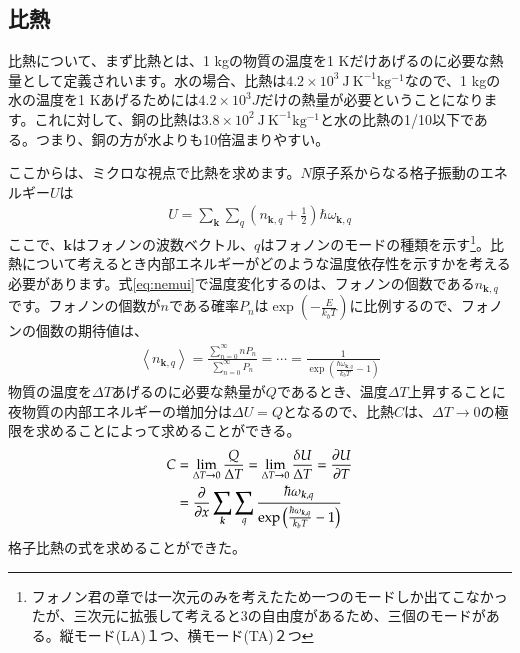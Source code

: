 \documentclass[10pt,b5paper,papersize,dvipdfmx]{jsbook}
\begin{document}
\subsection{比熱}
比熱について、まず比熱とは、1 kgの物質の温度を1 Kだけあげるのに必要な熱量として定義されいます。水の場合、比熱は$4.2 \times 10^3\  \mathrm{J\ K ^{-1} kg^{-1}}$なので、1 kgの水の温度を1 Kあげるためには$4.2 \times 10^3 J$だけの熱量が必要ということになります。これに対して、銅の比熱は$3.8 \times 10^2\ \mathrm{J\ K ^{-1} kg^{-1}}$と水の比熱の1/10以下である。つまり、銅の方が水よりも10倍温まりやすい。\par
ここからは、ミクロな視点で比熱を求めます。$N$原子系からなる格子振動のエネルギー$U$は
\begin{align}
  U = \sum_{\bm{k}}\sum_{q}\left(n_{\bm{k},q} + \frac{1}{2}\right)\hbar \omega_{\bm{k},q}
  \label{eq:nemui}
\end{align}
ここで、$\bm{k}$はフォノンの波数ベクトル、$q$はフォノンのモードの種類を示す\footnote{フォノン君の章では一次元のみを考えたため一つのモードしか出てこなかったが、三次元に拡張して考えると3の自由度があるため、三個のモードがある。縦モード(LA)１つ、横モード(TA)２つ}。比熱について考えるとき内部エネルギーがどのような温度依存性を示すかを考える必要があります。式\ref{eq:nemui}で温度変化するのは、フォノンの個数である$n_{\bm{k},q}$です。フォノンの個数が$n$である確率$P_n$は$\exp\left(-\frac{E}{k_bT}\right)$に比例するので、フォノンの個数の期待値は、
\begin{align}
  \left\langle n_{\bm{k},q}\right\rangle = \frac{\sum_{n = 0}^\infty nP_n}{\sum_{n = 0}^\infty P_n} = \cdots = \frac{1}{\exp \left(\frac{\hbar \omega_{\bm{k}, q}}{k_bT}-1\right)}
\end{align}
物質の温度を$\Delta T$あげるのに必要な熱量が$Q$であるとき、温度$\Delta T$上昇することに夜物質の内部エネルギーの増加分は$\Delta U = Q$となるので、比熱$C$は、$\Delta T \rightarrow 0$の極限を求めることによって求めることができる。
\begin{align}
  C &= \lim_{\Delta T \rightarrow 0} \frac{Q}{\Delta T} = \lim_{\Delta T \rightarrow 0} \frac{\delta U}{\Delta T} = \pdv{U}{T}\\
    &= \pdv{x} \sum_{\bm{k}}\sum_{q}\frac{\hbar \omega_{\bm{k},q}}{\exp\left(\frac{\hbar \omega_{\bm{k},q}}{k_bT}-1\right)}
\label{eq:totemonemutai}
\end{align}
格子比熱の式を求めることができた。
\end{document}
